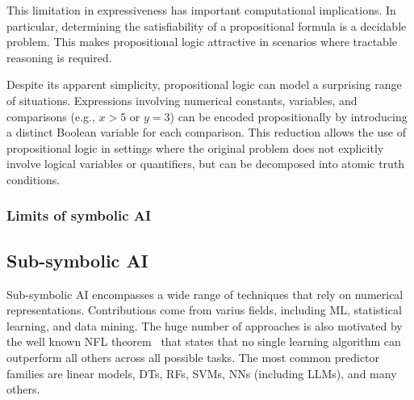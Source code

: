 This limitation in expressiveness has important computational implications.
%
In particular, determining the satisfiability of a propositional formula is a decidable problem.
%
This makes propositional logic attractive in scenarios where tractable reasoning is required.

Despite its apparent simplicity, propositional logic can model a surprising range of situations.
%
Expressions involving numerical constants, variables, and comparisons (e.g., $x > 5$ or $y = 3$) can be encoded propositionally by introducing a distinct Boolean variable for each comparison.
%
This reduction allows the use of propositional logic in settings where the original problem does not explicitly involve logical variables or quantifiers, but can be decomposed into atomic truth conditions.


\subsubsection[Limits of symbolic AI]{Limits of symbolic \Gls{AI}}\label{subsubsec:limits-of-symbolic-ai}



\subsection[Sub-symbolic AI]{Sub-symbolic \Gls{AI}}\label{subsec:sub-symbolic-ai}
%
Sub-symbolic \gls{AI} encompasses a wide range of techniques that rely on numerical representations.
%
Contributions come from varius fields, including \gls{ML}, statistical learning, and data mining.
%
The huge number of approaches is also motivated by the well known \gls{NFL} theorem~\cite{DBLP:journals/tec/DolpertM97} that states that no single learning algorithm can outperform all others across all possible tasks.
%
The most common predictor families are linear models, \glspl{DT}, \glspl{RF}, \glspl{SVM}, \glspl{NN} (including \glspl{LLM}), and many others.


